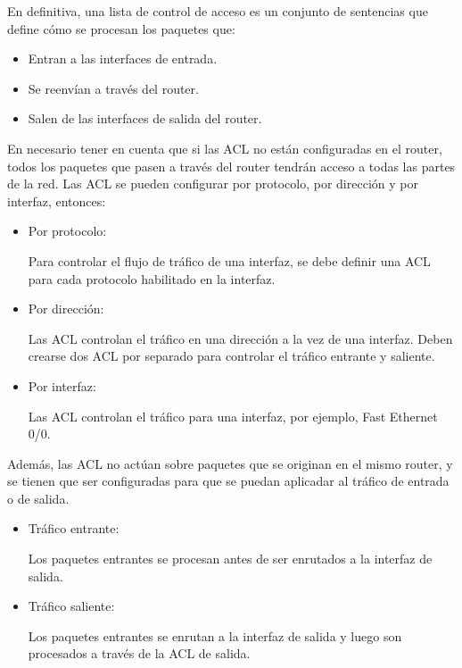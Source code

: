 \documentclass[a4paper,10pt]{article}
\begin{document}
En definitiva, una lista de control de acceso es un conjunto de sentencias que define cómo se procesan los paquetes que: 
\begin{itemize}
	\item Entran a las interfaces de entrada. 
    \item Se reenvían a través del router. 
    \item Salen de las interfaces de salida del router. 
\end{itemize}
    

En necesario tener en cuenta que si las ACL no están configuradas en el router, todos los paquetes que pasen a través del router tendrán acceso a todas las partes de la red.
Las ACL se pueden configurar por protocolo, por dirección y por interfaz, entonces: 
\begin{itemize}
	\item Por protocolo: 
	
	Para controlar el flujo de tráfico de una interfaz, se debe definir una ACL para cada protocolo habilitado en la interfaz. 
    \item Por dirección: 
    
    Las ACL controlan el tráfico en una dirección a la vez de una interfaz. Deben crearse dos ACL por separado para controlar el tráfico entrante y saliente. 
    \item Por interfaz: 
    
    Las ACL controlan el tráfico para una interfaz, por ejemplo, Fast Ethernet 0/0.
\end{itemize}
Además, las ACL no actúan sobre paquetes que se originan en el mismo router, y se tienen que ser configuradas para que se puedan aplicadar al tráfico de entrada o de salida.
\begin{itemize}
	\item Tráfico entrante: 
	
	Los paquetes entrantes se procesan antes de ser enrutados a la interfaz de salida. 
    \item Tráfico saliente:
    
    Los paquetes entrantes se enrutan a la interfaz de salida y luego son procesados a través de la ACL de salida. 
\end{itemize}
    
\end{document}
